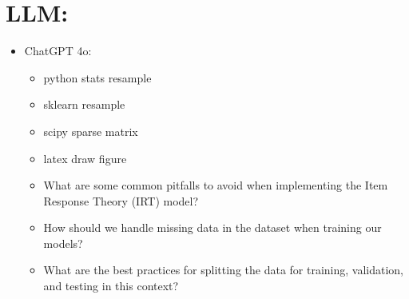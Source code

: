\documentclass{article}
\begin{document}
\newpage
\section*{LLM:}
\begin{itemize}
    \item ChatGPT 4o:
    \begin{itemize}
        \item python stats resample
        \item sklearn resample
        \item scipy sparse matrix
        \item latex draw figure
        \item What are some common pitfalls to avoid when implementing the Item Response Theory (IRT) model?
        \item How should we handle missing data in the dataset when training our models?
        \item What are the best practices for splitting the data for training, validation, and testing in this context?
    \end{itemize}
\end{itemize}
\end{document}
